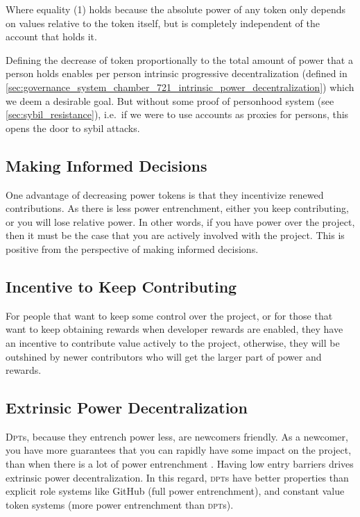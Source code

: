 Where equality (1) holds because the absolute power of any token only depends on values relative to the token itself, but is completely independent of the account that holds it.

Defining the decrease of token proportionally to the total amount of power that a person holds enables per person intrinsic progressive decentralization (defined in \cref{sec:governance_system_chamber_721_intrinsic_power_decentralization}) which we deem a desirable goal.
But without some proof of personhood system (see \cref{sec:sybil_resistance}), i.e.\ if we were to use accounts as proxies for persons, this opens the door to sybil attacks.

\subsection{Making Informed Decisions}

One advantage of decreasing power tokens is that they incentivize renewed contributions.
As there is less power entrenchment, either you keep contributing, or you will lose relative power.
In other words, if you have power over the project, then it must be the case that you are actively involved with the project.
This is positive from the perspective of making informed decisions.

\subsection{Incentive to Keep Contributing}

For people that want to keep some control over the project, or for those that want to keep obtaining rewards when developer rewards are enabled, they have an incentive to contribute value actively to the project, otherwise, they will be outshined by newer contributors who will get the larger part of power and rewards.

\subsection{Extrinsic Power Decentralization}

\textsc{Dpt}s, because they entrench power less, are newcomers friendly.
As a newcomer, you have more guarantees that you can rapidly have some impact on the project, than when there is a lot of power entrenchment%
.
Having low entry barriers drives extrinsic power decentralization.
In this regard, \textsc{dpt}s have better properties than explicit role systems like GitHub (full power entrenchment), and constant value token systems (more power entrenchment than \textsc{dpt}s).

